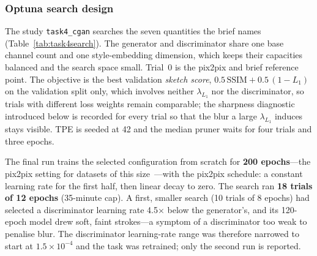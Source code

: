 \documentclass[conference]{IEEEtran}
\begin{document}
\subsubsection{Optuna search design}

The study \texttt{task4\_cgan} searches the seven quantities the brief names
(Table~\ref{tab:task4search}). The generator and discriminator share one base
channel count and one style-embedding dimension, which keeps their capacities
balanced and the search space small. Trial~0 is the pix2pix and brief reference
point. The objective is the best validation \emph{sketch score},
$0.5\,\mathrm{SSIM} + 0.5\,(1 - L_1)$ on the validation split only, which involves
neither $\lambda_{L_1}$ nor the discriminator, so trials with different loss
weights remain comparable; the sharpness diagnostic introduced below is recorded
for every trial so that the blur a large $\lambda_{L_1}$ induces stays visible.
TPE is seeded at 42 and the median pruner waits for four trials and three epochs.

The final run trains the selected configuration from scratch for \textbf{200
epochs}---the pix2pix setting for datasets of this size~\cite{isola2017image}---with
the pix2pix schedule: a constant learning rate for the first half, then linear
decay to zero. The search ran \textbf{18 trials of 12 epochs} (35-minute cap). A
first, smaller search (10 trials of 8 epochs) had selected a discriminator learning
rate 4.5$\times$ below the generator's, and its 120-epoch model drew soft, faint
strokes---a symptom of a discriminator too weak to penalise blur. The
discriminator learning-rate range was therefore narrowed to start at
$1.5\times10^{-4}$ and the task was retrained; only the second run is reported.
\end{document}
